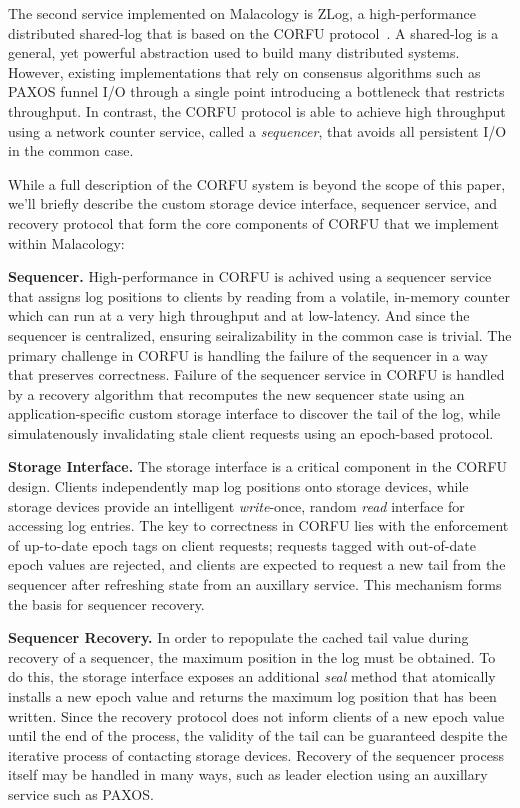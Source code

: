 \documentclass[10pt,twocolumn]{article}
\begin{document}
The second service implemented on Malacology is ZLog, a high-performance
distributed shared-log that is based on the CORFU
protocol~\cite{balakrishnan_corfu_2012}. A
shared-log is a general, yet powerful abstraction used to build many
distributed systems. However, existing implementations that rely on consensus
algorithms such as PAXOS funnel I/O through a single point introducing a
bottleneck that restricts throughput. In contrast, the CORFU protocol is able
to achieve high throughput using a network counter service, called a 
\emph{sequencer}, that avoids all persistent I/O in the common case.

While a full description of the CORFU system is beyond the scope of this
paper, we'll briefly describe the custom storage device interface, sequencer
service, and recovery protocol that form the core components of CORFU that we
implement within Malacology:

{\bf Sequencer.}
High-performance in CORFU is achived using a sequencer service that assigns
log positions to clients by reading from a volatile, in-memory counter which
can run at a very high throughput and at low-latency. And since the sequencer
is centralized, ensuring seiralizability in the common case is trivial.  The
primary challenge in CORFU is handling the failure of the sequencer in a way
that preserves correctness. Failure of the sequencer service in CORFU is
handled by a recovery algorithm that recomputes the new sequencer state using
an application-specific custom storage interface to discover the tail of the
log, while simulatenously invalidating stale client requests using an
epoch-based protocol.

{\bf Storage Interface.} The storage interface is a critical component in the
CORFU design. Clients independently map log positions onto storage devices,
while storage devices provide an intelligent \emph{write}-once, random
\emph{read} interface for accessing log entries. The key to correctness in
CORFU lies with the enforcement of up-to-date epoch tags on client requests;
requests tagged with out-of-date epoch values are rejected, and clients are
expected to request a new tail from the sequencer after refreshing state from
an auxillary service. This mechanism forms the basis for sequencer recovery.

{\bf Sequencer Recovery.}
In order to repopulate the cached tail value during recovery of a sequencer,
the maximum position in the log must be obtained. To do this, the storage
interface exposes an additional \emph{seal} method that atomically installs a
new epoch value and returns the maximum log position that has been written.
Since the recovery protocol does not inform clients of a new epoch value until
the end of the process, the validity of the tail can be guaranteed despite the
iterative process of contacting storage devices.  Recovery of the sequencer
process itself may be handled in many ways, such as leader election using an
auxillary service such as PAXOS.
\end{document}
